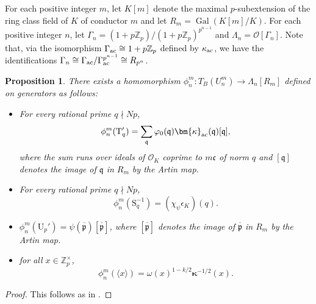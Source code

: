 \documentclass{amsart}
\numberwithin{equation}{section}
\newtheorem{proposition}[theorem]{Proposition}
\newcommand{\bb}{\mathbb}
\newcommand{\frk}{\mathfrak}
\newcommand{\Gal}{\operatorname{Gal}}
\newcommand{\ac}{\textup{ac}}
\begin{document}
For each positive integer $m$, let $K[m]$ denote the maximal $p$-subextension of the ring class field of $K$ of conductor $m$ and let $R_m=\Gal(K[m]/K)$. For each positive integer $n$, let $\Gamma_n=(1+p\bb{Z}_p)/(1+p\bb{Z}_p)^{p^{n-1}}$ and $\Lambda_n=\mathcal{O}[\Gamma_n]$. Note that, via the isomorphism $\Gamma_{\ac}\cong 1+p\bb{Z}_p$ defined by $\kappa_{\ac}$, we have the identifications $\Gamma_n\cong \Gamma_{\ac}/\Gamma_{\ac}^{p^{n-1}}\cong R_{p^{n}}$. 


\begin{proposition}
There exists a homomorphism $\phi^m_n:T_B(U_n^m)\rightarrow \Lambda_n[R_m]$ defined on generators as follows:
\begin{itemize}
    \item For every rational prime $q\nmid Np$,
    \[
    \phi^m_n(\mathrm{T}_q')=\sum_{\frk{q}}\varphi_0(\frk{q})\bm{\kappa}_{\ac}(\frk{q})[\frk{q}],
    \]
    where the sum runs over ideals of $\mathcal{O}_K$ coprime to $m\frk{c}$ of norm $q$ and $[\frk{q}]$ denotes the image of $\frk{q}$ in $R_m$ by the Artin map.
    \item For every rational prime $q\nmid Np$,
    \[
    \phi_n^m(\mathrm{S}_q^{-1})=(\chi_\psi\epsilon_K)(q).
    \]
    \item $\phi_{n}^m(\mathrm{U}_p')=\psi(\overline{\frk{p}})[\overline{\frk{p}}]$, where $[\overline{\frk{p}}]$ denotes the image of $\overline{\frk{p}}$ in $R_m$ by the Artin map.
    \item for all $x\in \mathbb{Z}_p^\times$,
    \[
    \phi_n^m(\langle x\rangle)=\omega(x)^{1-k/2}\bm{\kappa}^{-1/2}(x).
    \]
\end{itemize}
\end{proposition}
\begin{proof}
    This follows as in \cite[Prop.~3.2.1]{LLZ2}.
\end{proof}
\end{document}
